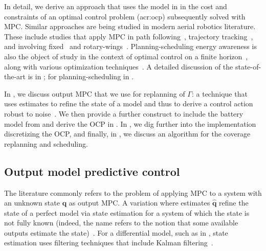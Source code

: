 In detail, we derive an approach that uses the model in  in the cost and constraints of an optimal control problem (\Gls{acr:ocp}) subsequently solved with MPC. Similar approaches are being studied in modern aerial robotics literature. These include studies that apply MPC in path following~\citep{gavilan2015iterative}, trajectory tracking~\citep{torrente2021data}, and involving fixed~\citep{kang2009linear,stastny2018nonlinear,chao2011collision,cavanini2021model} and rotary-wings~\citep{kostadinov2020online,song2020learning,bicego2020nonlinear}. Planning-scheduling energy awareness is also the object of study in the context of optimal control on a finite horizon~\citep{zhang2007low,ondruska2015scheduled}, along with various optimization techniques~\citep{lahijanian2018resource,brateman2006energy}. A detailed discussion of the state-of-the-art is in ; for planning-scheduling in .

In , we discuss output MPC that we use for replanning of $\Gamma$: a technique that uses estimates to refine the state of a model and thus to derive a control action robust to noise~\citep{rawlings2017model}. We then provide a further construct to include the battery model from  and derive the OCP in . In , we dig further into the implementation discretizing the OCP, and finally, in , we discuss an algorithm for the coverage replanning and scheduling. 

\subsection{Output model predictive control}
\label{sec:output-mpc}

The literature commonly refers to the problem of applying MPC to a system with an unknown state $\mathbf{q}$ as output MPC. A variation where estimates $\hat{\mathbf{q}}$ refine the state of a perfect model via state estimation for a system of which the state is not fully known (indeed, the name refers to the notion that some available outputs estimate the state)~\citep{rawlings2017model}. For a differential model, such as  in , state estimation uses filtering techniques that include Kalman filtering~\citep{simon2006optimal,kalman1960new}.

